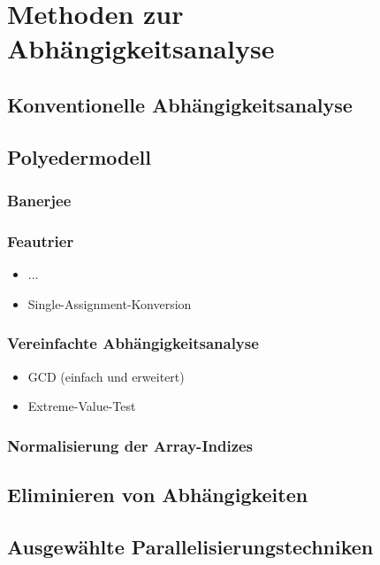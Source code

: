 
\section{Methoden zur Abhängigkeitsanalyse}
\subsection{Konventionelle Abhängigkeitsanalyse}
\subsection{Polyedermodell}
\subsubsection{Banerjee}
\subsubsection{Feautrier}
    \begin{itemize}
        \item ...
        \item Single-Assignment-Konversion
    \end{itemize}
\subsubsection{Vereinfachte Abhängigkeitsanalyse}
    \begin{itemize}
        \item GCD (einfach und erweitert)
        \item Extreme-Value-Test
    \end{itemize}
\subsubsection{Normalisierung der Array-Indizes}
\subsection{Eliminieren von Abhängigkeiten}
\subsection{Ausgewählte Parallelisierungstechniken}